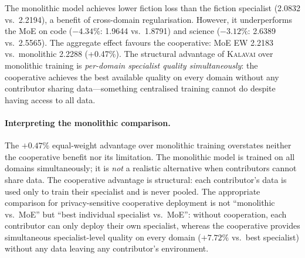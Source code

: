 \documentclass{article}
\newcommand{\kalavai}{\textsc{Kalavai}\xspace}
\begin{document}
The monolithic model achieves lower fiction loss than the fiction specialist (2.0832 vs.\ 2.2194), a benefit of cross-domain regularisation. However, it underperforms the MoE on code ($-4.34\%$: 1.9644 vs.\ 1.8791) and science ($-3.12\%$: 2.6389 vs.\ 2.5565). The aggregate effect favours the cooperative: MoE EW 2.2183 vs.\ monolithic 2.2288 (+0.47\%). The structural advantage of \kalavai over monolithic training is \emph{per-domain specialist quality simultaneously}: the cooperative achieves the best available quality on every domain without any contributor sharing data---something centralised training cannot do despite having access to all data.

\paragraph{Interpreting the monolithic comparison.}
The $+0.47\%$ equal-weight advantage over monolithic training overstates neither the
cooperative benefit nor its limitation.
The monolithic model is trained on all domains simultaneously; it is \emph{not} a realistic
alternative when contributors cannot share data.
The cooperative advantage is structural: each contributor's data is used only to train their
specialist and is never pooled. The appropriate comparison for privacy-sensitive cooperative
deployment is not ``monolithic vs.\ MoE'' but ``best individual specialist vs.\ MoE'':
without cooperation, each contributor can only deploy their own specialist,
whereas the cooperative provides simultaneous specialist-level quality on every domain ($+7.72\%$
vs.\ best specialist) without any data leaving any contributor's environment.
\end{document}
